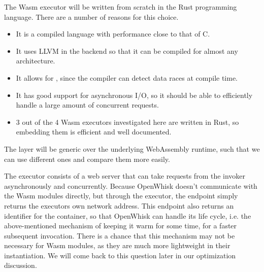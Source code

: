The Wasm executor will be written from scratch in the Rust programming language. There are a number of reasons for this choice.

\begin{itemize}
  \item It is a compiled language with performance close to that of C.
  \item It uses LLVM in the backend so that it can be compiled for almost any architecture.
  \item It allows for , since the compiler can detect data races at compile time.
  \item It has good support for asynchronous I/O, so it should be able to efficiently handle a large amount of concurrent requests.
  \item 3 out of the 4 Wasm executors investigated here are written in Rust, so embedding them is efficient and well documented.
\end{itemize}

The layer will be generic over the underlying WebAssembly runtime, such that we can use different ones and compare them more easily.

The executor consists of a web server that can take requests from the invoker asynchronously and concurrently. Because OpenWhisk doesn't communicate with the Wasm modules directly, but through the executor, the  endpoint simply returns the executors own network address. This endpoint also returns an identifier for the container, so that OpenWhisk can handle its life cycle, i.e. the above-mentioned mechanism of keeping it warm for some time, for a faster subsequent invocation. There is a chance that this mechanism may not be necessary for Wasm modules, as they are much more lightweight in their instantiation. We will come back to this question later in our optimization discussion.

